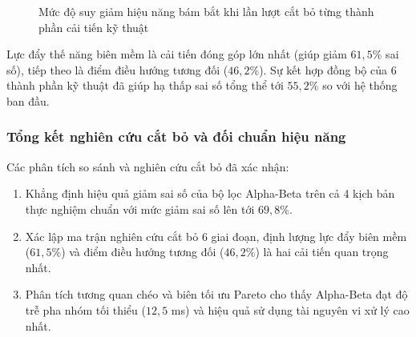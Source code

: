 \begin{figure}[H]
\centering
{}
\caption{Mức độ suy giảm hiệu năng bám bắt khi lần lượt cắt bỏ từng thành phần cải tiến kỹ thuật}
\label{fig:ablation-bar}
\end{figure}

Lực đẩy thế năng biên mềm là cải tiến đóng góp lớn nhất (giúp giảm $61{,}5\%$ sai số), tiếp theo là điểm điều hướng tương đối ($46{,}2\%$). Sự kết hợp đồng bộ của 6 thành phần kỹ thuật đã giúp hạ thấp sai số tổng thể tới $55{,}2\%$ so với hệ thống ban đầu.

\subsubsection{Tổng kết nghiên cứu cắt bỏ và đối chuẩn hiệu năng}

\hspace{0.5cm} Các phân tích so sánh và nghiên cứu cắt bỏ đã xác nhận:
\begin{enumerate}
    \item Khẳng định hiệu quả giảm sai số của bộ lọc Alpha-Beta trên cả 4 kịch bản thực nghiệm chuẩn với mức giảm sai số lên tới $69{,}8\%$.
    \item Xác lập ma trận nghiên cứu cắt bỏ 6 giai đoạn, định lượng lực đẩy biên mềm ($61{,}5\%$) và điểm điều hướng tương đối ($46{,}2\%$) là hai cải tiến quan trọng nhất.
        \item Phân tích tương quan chéo và biên tối ưu Pareto cho thấy Alpha-Beta đạt độ trễ pha nhóm tối thiểu ($12{,}5$ ms) và hiệu quả sử dụng tài nguyên vi xử lý cao nhất.
\end{enumerate}
